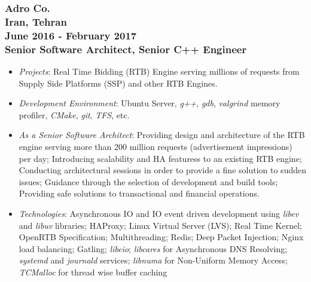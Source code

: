 \documentclass[10pt,a4paper]{article}
\begin{document}
\subsubsection{{\large Adro Co.} \\ \textnormal{Iran, Tehran} \\ \textnormal{June 2016 - February 2017} \\ {Senior Software Architect, Senior C++ Engineer}}
  \setlength{\leftskip}{0.5cm}
  \setlength{\rightskip}{1cm}
  \begin{itemize}
    \setlength{\rightskip}{1cm}
    \setlength\itemsep{0em}
    \item \small \textit {Projects}: Real Time Bidding (RTB) Engine serving millions of requests from Supply Side Platforms (SSP) and other RTB Engines.
    \item \small \textit {Development Environment}: Ubuntu Server, \textit{g++}, \textit{gdb}, \textit{valgrind} memory profiler, \textit{CMake}, \textit{git}, \textit{TFS}, etc.
    \item \small \textit {As a Senior Software Architect}: Providing design and architecture of the RTB engine serving more than 200 million requests (advertisement impressions) per day; Introducing scalability and HA featuress to an existing RTB engine; Conducting architectural sessions in order to provide a fine solution to sudden issues; Guidance through the selection of development and build tools; Providing safe solutions to transactional and financial operations.
    \item \small \textit {Technologies}: Asynchronous IO and IO event driven development using \textit{libev} and \textit{libuv} libraries; HAProxy; Linux Virtual Server (LVS); Real Time Kernel; OpenRTB Specification; Multithreading; Redis; Deep Packet Injection; Nginx load balancing; Gatling; \textit{libeio}; \textit{libcares} for Asynchronous DNS Resolving; \textit{systemd} and \textit{journald} services; \textit{libnuma} for Non-Uniform Memory Access; \textit{TCMalloc} for thread wise buffer caching 
  \end{itemize}
  \setlength{\leftskip}{0pt}
  \setlength{\rightskip}{0cm}
  
\end{document}
